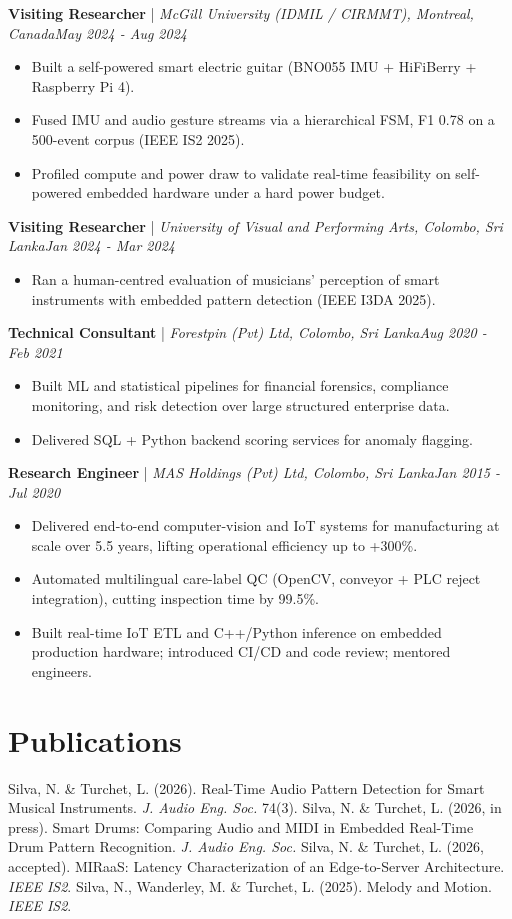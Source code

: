 \documentclass[11pt]{article}
\newenvironment{cvrole}[5]{%
  \par\noindent\textbf{\large #1} | \textit{\small #2, #3}\hfill \textit{\small #4 - #5}\par
  \begin{itemize}[leftmargin=2em, itemsep=-0.3em, topsep=-0.5em]%
}{%
  \end{itemize}\par\noindent\mbox{}\par\vspace{0.1em}%
}
\begin{document}
\begin{cvrole}{Visiting Researcher}{McGill University (IDMIL / CIRMMT)}{Montreal, Canada}{May 2024}{Aug 2024}
\item Built a self-powered smart electric guitar (BNO055 IMU + HiFiBerry + Raspberry Pi 4).
\item Fused IMU and audio gesture streams via a hierarchical FSM, F1 0.78 on a 500-event corpus (IEEE IS2 2025).
\item Profiled compute and power draw to validate real-time feasibility on self-powered embedded hardware under a hard power budget.
\end{cvrole}

\begin{cvrole}{Visiting Researcher}{University of Visual and Performing Arts}{Colombo, Sri Lanka}{Jan 2024}{Mar 2024}
\item Ran a human-centred evaluation of musicians' perception of smart instruments with embedded pattern detection (IEEE I3DA 2025).
\end{cvrole}

\begin{cvrole}{Technical Consultant}{Forestpin (Pvt) Ltd}{Colombo, Sri Lanka}{Aug 2020}{Feb 2021}
\item Built ML and statistical pipelines for financial forensics, compliance monitoring, and risk detection over large structured enterprise data.
\item Delivered SQL + Python backend scoring services for anomaly flagging.
\end{cvrole}

\begin{cvrole}{Research Engineer}{MAS Holdings (Pvt) Ltd}{Colombo, Sri Lanka}{Jan 2015}{Jul 2020}
\item Delivered end-to-end computer-vision and IoT systems for manufacturing at scale over 5.5 years, lifting operational efficiency up to +300\%.
\item Automated multilingual care-label QC (OpenCV, conveyor + PLC reject integration), cutting inspection time by 99.5\%.
\item Built real-time IoT ETL and C++/Python inference on embedded production hardware; introduced CI/CD and code review; mentored engineers.
\end{cvrole}

\section*{Publications}
Silva, N. \& Turchet, L. (2026). Real-Time Audio Pattern Detection for Smart Musical Instruments. \textit{J. Audio Eng. Soc.} 74(3). Silva, N. \& Turchet, L. (2026, in press). Smart Drums: Comparing Audio and MIDI in Embedded Real-Time Drum Pattern Recognition. \textit{J. Audio Eng. Soc.} Silva, N. \& Turchet, L. (2026, accepted). MIRaaS: Latency Characterization of an Edge-to-Server Architecture. \textit{IEEE IS2}. Silva, N., Wanderley, M. \& Turchet, L. (2025). Melody and Motion. \textit{IEEE IS2}.
\end{document}
